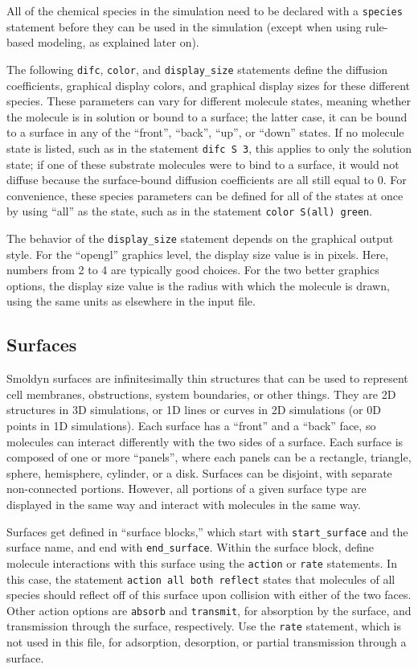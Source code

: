 \documentclass {book}
\newcommand {\ttt} {\texttt}
\begin{document}
All of the chemical species in the simulation need to be declared with a  \ttt{species} statement before they can be used in the simulation (except when using rule-based modeling, as explained later on).

The following  \ttt{difc},  \ttt{color}, and  \ttt{display\_size} statements define the diffusion coefficients, graphical display colors, and graphical display sizes for these different species. These parameters can vary for different molecule states, meaning whether the molecule is in solution or bound to a surface; the latter case, it can be bound to a surface in any of the ``front'', ``back'', ``up'', or ``down'' states. If no molecule state is listed, such as in the statement  \ttt{difc S 3}, this applies to only the solution state; if one of these substrate molecules were to bind to a surface, it would not diffuse because the surface-bound diffusion coefficients are all still equal to 0. For convenience, these species parameters can be defined for all of the states at once by using ``all'' as the state, such as in the statement  \ttt{color S(all) green}.

The behavior of the \ttt{display\_size} statement depends on the graphical output style. For the ``opengl'' graphics level, the display size value is in pixels. Here, numbers from 2 to 4 are typically good choices. For the two better graphics options, the display size value is the radius with which the molecule is drawn, using the same units as elsewhere in the input file.

\subsection*{Surfaces}

Smoldyn surfaces are infinitesimally thin structures that can be used to represent cell membranes, obstructions, system boundaries, or other things. They are 2D structures in 3D simulations, or 1D lines or curves in 2D simulations (or 0D points in 1D simulations). Each surface has a ``front'' and a ``back'' face, so molecules can interact differently with the two sides of a surface. Each surface is composed of one or more ``panels'', where each panels can be a rectangle, triangle, sphere, hemisphere, cylinder, or a disk. Surfaces can be disjoint, with separate non-connected portions. However, all portions of a given surface type are displayed in the same way and interact with molecules in the same way.

Surfaces get defined in ``surface blocks,'' which start with  \ttt{start\_surface} and the surface name, and end with  \ttt{end\_surface}. Within the surface block, define molecule interactions with this surface using the  \ttt{action} or  \ttt{rate} statements. In this case, the statement  \ttt{action all both reflect} states that molecules of all species should reflect off of this surface upon collision with either of the two faces. Other action options are  \ttt{absorb} and  \ttt{transmit}, for absorption by the surface, and transmission through the surface, respectively. Use the  \ttt{rate} statement, which is not used in this file, for adsorption, desorption, or partial transmission through a surface.
\end{document}

